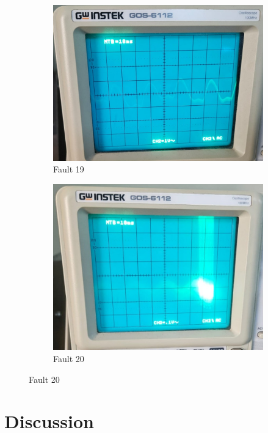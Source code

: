 \documentclass[a4paper,12pt]{article}
\begin{document}
\begin{figure}[H]
	\begin{subfigure}[t]{0.44\textwidth}
		\centering
		\includegraphics[width=1\linewidth]{Images/1.19}
		\caption{Fault 19}
		\vspace{0.1cm}
	\end{subfigure}
	\hfil
	\begin{subfigure}[t]{0.44\textwidth}
		\centering
		\includegraphics[width=1\linewidth]{Images/1.20}
		\caption{Fault 20}
		\vspace{0.1cm}
	\end{subfigure}
	
	
\end{figure}


	\section{Discussion}
	
\end{document}
